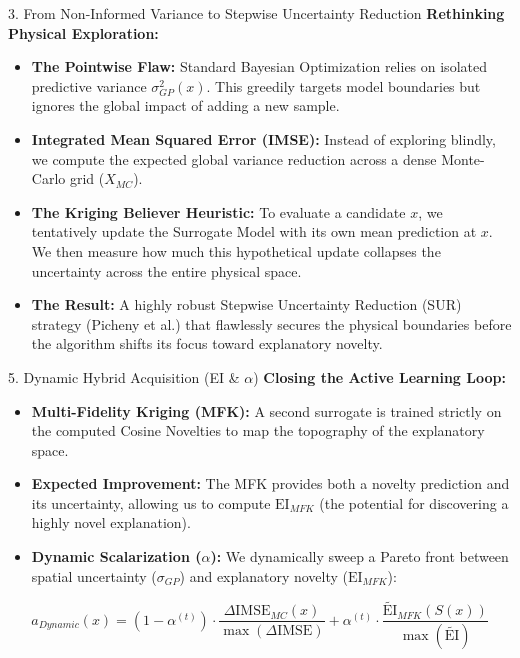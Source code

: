 \documentclass[10pt, aspectratio=169]{beamer}
\begin{document}
\begin{frame}[fragile]{3. From Non-Informed Variance to Stepwise Uncertainty Reduction}
  \textbf{Rethinking Physical Exploration:}
  \begin{itemize}
      \item \textbf{The Pointwise Flaw:} Standard Bayesian Optimization relies on isolated predictive variance $\sigma^2_{GP}(x)$. This greedily targets model boundaries but ignores the global impact of adding a new sample.
      \item \textbf{Integrated Mean Squared Error (IMSE):} Instead of exploring blindly, we compute the expected global variance reduction across a dense Monte-Carlo grid ($X_{MC}$).
      \item \textbf{The Kriging Believer Heuristic:} To evaluate a candidate $x$, we tentatively update the Surrogate Model with its own mean prediction at $x$. We then measure how much this hypothetical update collapses the uncertainty across the entire physical space.
      \item \textbf{The Result:} A highly robust Stepwise Uncertainty Reduction (SUR) strategy (Picheny et al.) that flawlessly secures the physical boundaries before the algorithm shifts its focus toward explanatory novelty.
  \end{itemize}
\end{frame}


\begin{frame}[fragile]{5. Dynamic Hybrid Acquisition (EI \& $\alpha$)}
  \textbf{Closing the Active Learning Loop:}
  \begin{itemize}
      \item \textbf{Multi-Fidelity Kriging (MFK):} A second surrogate is trained strictly on the computed Cosine Novelties to map the topography of the explanatory space.
      \item \textbf{Expected Improvement:} The MFK provides both a novelty prediction and its uncertainty, allowing us to compute $\text{EI}_{MFK}$ (the potential for discovering a highly novel explanation).
      \item \textbf{Dynamic Scalarization ($\alpha$):} We dynamically sweep a Pareto front between spatial uncertainty ($\sigma_{GP}$) and explanatory novelty ($\text{EI}_{MFK}$):
  \end{itemize}
  $$a_{Dynamic}(x) = (1 - \alpha^{(t)}) \cdot \frac{\Delta\text{IMSE}_{MC}(x)}{\max(\Delta\text{IMSE})} + \alpha^{(t)} \cdot \frac{\widetilde{\text{EI}}_{MFK}(S(x))}{\max(\widetilde{\text{EI}})}$$
\end{frame}
\end{document}

